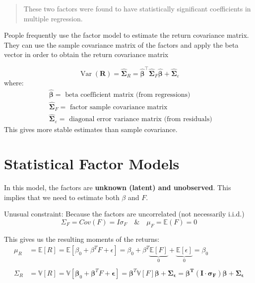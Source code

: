 \documentclass[
  oneside]{book}
\begin{document}
\begin{quote}
These two factors were found to have statistically significant coefficients in multiple regression.
\end{quote}

People frequently use the factor model to estimate the return covariance matrix.
They can use the sample covariance matrix of the factors and apply the beta vector in order to obtain the return covariance matrix

\[
\operatorname{Var}(\mathbf{R})=\hat{\boldsymbol{\Sigma}}_R=\hat{\boldsymbol{\beta}}^{\top} \hat{\boldsymbol{\Sigma}}_F \hat{\boldsymbol{\beta}}+\hat{\boldsymbol{\Sigma}}_{\varepsilon}
\]
where:
\[
\begin{aligned}
& \hat{\boldsymbol{\beta}}=\text { beta coefficient matrix (from regressions) } \\
& \hat{\boldsymbol{\Sigma}}_F=\text { factor sample covariance matrix } \\
& \hat{\boldsymbol{\Sigma}}_{\varepsilon}=\text { diagonal error variance matrix (from residuals) }
\end{aligned}
\]
This gives more stable estimates than sample covariance.

\hypertarget{statistical-factor-models}{%
\section{Statistical Factor Models}\label{statistical-factor-models}}

In this model, the factors are \textbf{unknown (latent) and unobserved}. This implies that we need to estimate both \(\beta\) and \(F\).

Unusual constraint: Because the factors are uncorrelated (not necessarily i.i.d.)
\[
\Sigma_{F} = Cov(F)= I \sigma_F \quad \& \quad \mu_{F}=\mathbb{E}(F) = 0
\]

This gives us the resulting moments of the returns:
\[
\begin{aligned}
\mu_{R} &= \mathbb{E}[R] = \mathbb{E}[\beta_{0}+\beta^TF + \epsilon] = \beta_{0}+\beta^{T}\underbrace{ \mathbb{E}[F] }_{ 0 }+\underbrace{ \mathbb{E}[\epsilon] }_{ 0 } = \beta_{0}\\
\\
\Sigma_{R} &= \mathbb{V}[R] = \mathbb{V}[\boldsymbol{\beta}_{0}+\boldsymbol{\beta}^{T}F+\boldsymbol{\epsilon}] = \boldsymbol{\beta}^{T}\mathbb{V}[F]\boldsymbol{\beta}+\boldsymbol{\Sigma_{\epsilon} = \beta^{T}(I\cdot \sigma_{F})\beta+\Sigma_{\epsilon}}
\end{aligned}
\]
\end{document}
